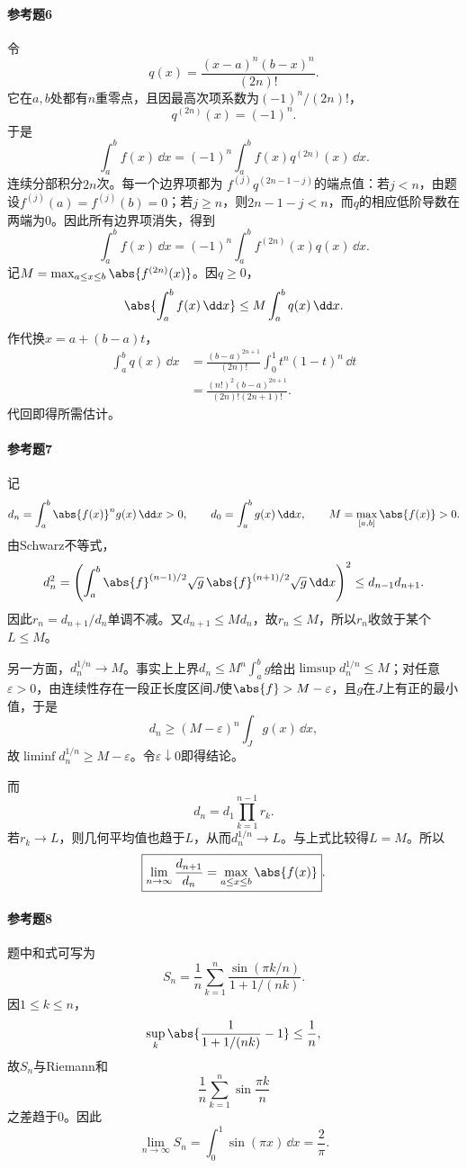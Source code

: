 \paragraph{参考题6}
\begin{xsolution}
令
\[
 q(x)=\frac{(x-a)^n(b-x)^n}{(2n)!}.
\]
它在$a,b$处都有$n$重零点，且因最高次项系数为$(-1)^n/(2n)!$，
\[
 q^{(2n)}(x)=(-1)^n.
\]
于是
\[
 \int_a^bf(x)\,\dd x
 =(-1)^n\int_a^bf(x)q^{(2n)}(x)\,\dd x.
\]
连续分部积分$2n$次。每一个边界项都为
$f^{(j)}q^{(2n-1-j)}$的端点值：若$j<n$，由题设$f^{(j)}(a)=f^{(j)}(b)=0$；若$j\ge n$，则$2n-1-j<n$，而$q$的相应低阶导数在两端为0。因此所有边界项消失，得到
\[
 \int_a^bf(x)\,\dd x
 =(-1)^n\int_a^bf^{(2n)}(x)q(x)\,\dd x.
\]
记$M=\max_{a\le x\le b}\abs{f^{(2n)}(x)}$。因$q\ge0$，
\[
 \abs{\int_a^bf(x)\,\dd x}
 \le M\int_a^bq(x)\,\dd x.
\]
作代换$x=a+(b-a)t$，
\begin{align*}
\int_a^bq(x)\,\dd x
&=\frac{(b-a)^{2n+1}}{(2n)!}
 \int_0^1t^n(1-t)^n\,\dd t\\
&=\frac{(n!)^2(b-a)^{2n+1}}{(2n)!(2n+1)!}.
\end{align*}
代回即得所需估计。
\end{xsolution}

\paragraph{参考题7}
\begin{xsolution}
记
\[
 d_n=\int_a^b\abs{f(x)}^ng(x)\,\dd x>0,
 \qquad
 d_0=\int_a^bg(x)\,\dd x,
 \qquad
 M=\max_{[a,b]}\abs{f(x)}>0.
\]
由Schwarz不等式，
\[
 d_n^2
 =\left(\int_a^b
 \abs{f}^{(n-1)/2}\sqrt{g}\,
 \abs{f}^{(n+1)/2}\sqrt{g}\,\dd x\right)^2
 \le d_{n-1}d_{n+1}.
\]
因此$r_n=d_{n+1}/d_n$单调不减。又$d_{n+1}\le Md_n$，故$r_n\le M$，所以$r_n$收敛于某个$L\le M$。

另一方面，$d_n^{1/n}\to M$。事实上上界$d_n\le M^n\int_a^bg$给出$\limsup d_n^{1/n}\le M$；对任意$\varepsilon>0$，由连续性存在一段正长度区间$J$使$\abs{f}>M-\varepsilon$，且$g$在$J$上有正的最小值，于是
\[
 d_n\ge(M-\varepsilon)^n\int_Jg(x)\,\dd x,
\]
故$\liminf d_n^{1/n}\ge M-\varepsilon$。令$\varepsilon\downarrow0$即得结论。

而
\[
 d_n=d_1\prod_{k=1}^{n-1}r_k.
\]
若$r_k\to L$，则几何平均值也趋于$L$，从而$d_n^{1/n}\to L$。与上式比较得$L=M$。所以
\[
 \boxed{\lim_{n\to\infty}\frac{d_{n+1}}{d_n}
 =\max_{a\le x\le b}\abs{f(x)}}.
\]
\end{xsolution}

\paragraph{参考题8}
\begin{xsolution}
题中和式可写为
\[
 S_n=\frac1n\sum_{k=1}^n
 \frac{\sin(\pi k/n)}{1+1/(nk)}.
\]
因$1\le k\le n$，
\[
 \sup_k\abs{\frac1{1+1/(nk)}-1}\le\frac1n,
\]
故$S_n$与Riemann和
\[
 \frac1n\sum_{k=1}^n\sin\frac{\pi k}{n}
\]
之差趋于0。因此
\[
 \lim_{n\to\infty}S_n
 =\int_0^1\sin(\pi x)\,\dd x
 =\boxed{\frac2\pi}.
\]
\end{xsolution}

